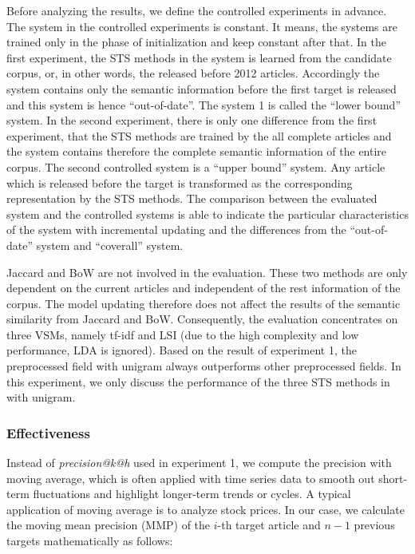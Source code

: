 Before analyzing the results, we define the controlled experiments in advance. The system in the controlled experiments is constant. It means, the systems are trained only in the phase of initialization and keep constant after that. In the first experiment, the STS methods in the system is learned from the candidate corpus, or, in other words, the released before 2012 articles. Accordingly the system contains only the semantic information before the first target is released and this system is hence ``out-of-date''. The system 1 is called the ``lower bound'' system. In the second experiment, there is only one difference from the first experiment, that the STS methods are trained by the all complete articles and the system contains therefore the complete semantic information of the entire corpus. The second controlled system is a ``upper bound'' system. Any article which is released before the target is transformed as the corresponding representation by the STS methods.  The comparison between the evaluated system and the controlled systems is able to indicate the particular characteristics of the system with incremental updating and the differences from the ``out-of-date'' system and ``coverall'' system. 

Jaccard and BoW are not involved in the evaluation. These two methods are only dependent on the current articles and independent of the rest information of the corpus. The model updating therefore does not affect the results of the semantic similarity from Jaccard and BoW. Consequently, the evaluation concentrates on three VSMs, namely tf-idf and LSI (due to the high complexity and low performance, LDA is ignored). Based on the result of experiment 1, the preprocessed field \icontent{} with unigram always outperforms other preprocessed fields. In this experiment, we only discuss the performance of the three STS methods in \icontent{} with unigram. 

\subsubsection{Effectiveness}

Instead of \textit{precision@k@h} used in experiment 1, we compute the precision with moving average, which is often applied with time series data to smooth out short-term fluctuations and highlight longer-term trends or cycles. A typical application of moving average is to analyze stock prices. In our case, we calculate the moving mean precision (MMP) of the $i$-th target article and $n-1$ previous targets mathematically as follows:

